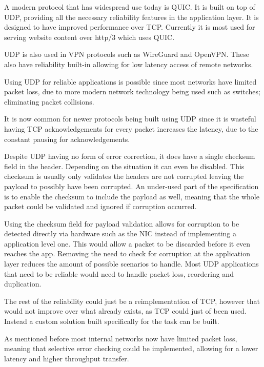 A modern protocol that has widespread use today is QUIC. It is built on top of UDP, providing all the necessary reliability features in the application layer. It is designed to have improved performance over TCP. Currently it is most used for serving website content over http/3 which uses QUIC.

UDP is also used in VPN protocols such as WireGuard and OpenVPN. These also have reliability built-in allowing for low latency access of remote networks.

Using UDP for reliable applications is possible since most networks have limited packet loss, due to more modern network technology being used such as switches; eliminating packet collisions.

It is now common for newer protocols being built using UDP since it is wasteful having TCP acknowledgements for every packet increases the latency, due to the constant pausing for acknowledgements.

Despite UDP having no form of error correction, it does have a single checksum field in the header. Depending on the situation it can even be disabled. This checksum is usually only validates the headers are not corrupted leaving the payload to possibly have been corrupted. An under-used part of the specification is to enable the checksum to include the payload as well, meaning that the whole packet could be validated and ignored if corruption occurred.

Using the checksum field for payload validation allows for corruption to be detected directly via hardware such as the NIC instead of implementing a application level one. This would allow a packet to be discarded before it even reaches the app. Removing the need to check for corruption at the application layer reduces the amount of possible scenarios to handle. Most UDP applications that need to be reliable would need to handle packet loss, reordering and duplication.

The rest of the reliability could just be a reimplementation of TCP, however that would not improve over what already exists, as TCP could just of been used. Instead a custom solution built specifically for the task can be built.

As mentioned before most internal networks now have limited packet loss, meaning that selective error checking could be implemented, allowing for a lower latency and higher throughput transfer.


